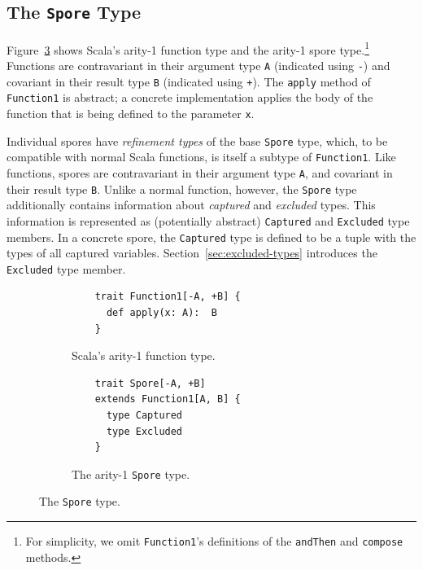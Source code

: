 \documentclass[runningheads]{llncs}
\begin{document}
\begin{sloppypar}
\vspace{2mm}
\subsection{The \texttt{Spore} Type}
\label{sec:spore-type}
\vspace{1mm}




Figure~\ref{fig:spore-type} shows Scala's arity-1 function type and the arity-1 spore type.\footnote{For simplicity, we omit \verb+Function1+'s definitions of the \verb+andThen+ and \verb+compose+ methods.}
Functions are contravariant in their argument type \verb|A| (indicated using
\verb|-|) and covariant in their result type \verb|B| (indicated
using \verb|+|). The \verb|apply| method of \verb|Function1| is abstract; a concrete implementation applies
the body of the function that is being defined to the parameter \verb|x|.

Individual spores have {\em refinement types} of the base \verb|Spore| type, which, to be compatible with normal Scala functions,
is itself a subtype of \verb|Function1|. Like functions, spores are contravariant in their argument type \verb|A|, and
covariant in their result type \verb|B|. Unlike a normal function,
however, the \verb|Spore| type additionally contains information about
\textit{captured} and \textit{excluded} types. This information is represented
as (potentially abstract) \verb|Captured| and \verb|Excluded| type members. In a
concrete spore, the \verb|Captured| type is defined to be a tuple with the types of all captured variables.
Section~\ref{sec:excluded-types} introduces the \verb|Excluded| type member.


\begin{figure}[b!]
\vspace{-2mm}
\begin{subfigure}{.5\textwidth}
  \centering
  \begin{lstlisting}
    trait Function1[-A, +B] {
      def apply(x: A):  B
    }
  \end{lstlisting}
  \caption{Scala's arity-1 function type.}
  \label{fig:function-arity1}
\end{subfigure}%
\begin{subfigure}{.5\textwidth}
  \centering
  \begin{lstlisting}
    trait Spore[-A, +B]
    extends Function1[A, B] {
      type Captured
      type Excluded
    }
  \end{lstlisting}
  \caption{The arity-1 \texttt{Spore} type.}
  \label{fig:spore-arity1}
\end{subfigure}%
\vspace{-1mm}
\caption{The \texttt{Spore} type.}
\label{fig:spore-type}
\vspace{-2mm}
\end{figure}



\end{sloppypar}
\end{document}
